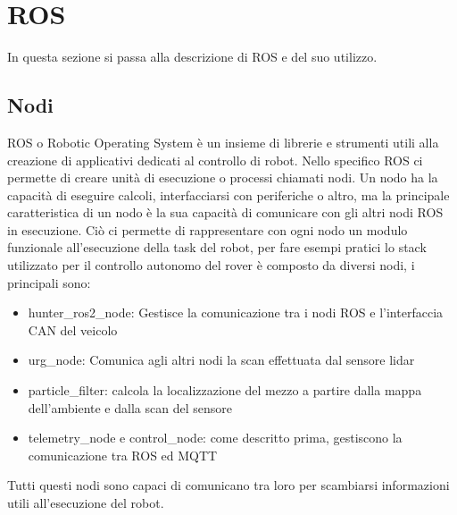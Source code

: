 \section{ROS}
In questa sezione si passa alla descrizione di ROS e del suo utilizzo.
\subsection{Nodi}
ROS o Robotic Operating System è un insieme di librerie e strumenti utili alla creazione di applicativi dedicati al controllo di robot.
Nello specifico ROS ci permette di creare unità di esecuzione o processi chiamati nodi. Un nodo ha la capacità di eseguire calcoli, interfacciarsi con periferiche o altro, ma la principale caratteristica di un nodo è la sua capacità di comunicare con gli altri nodi ROS in esecuzione.
\noindent Ciò ci permette di rappresentare con ogni nodo un modulo funzionale all'esecuzione della task del robot, per fare esempi pratici lo stack utilizzato per il controllo autonomo del rover è composto da diversi nodi, i principali sono: 
\noindent \begin{itemize}
  \item hunter\_ros2\_node: Gestisce la comunicazione tra i nodi ROS e l'interfaccia CAN del veicolo
  \item urg\_node: Comunica agli altri nodi la scan effettuata dal sensore lidar
  \item particle\_filter: calcola la localizzazione del mezzo a partire dalla mappa dell'ambiente e dalla scan del sensore
  \item telemetry\_node e control\_node: come descritto prima, gestiscono la comunicazione tra ROS ed MQTT 
\end{itemize}
Tutti questi nodi sono capaci di comunicano tra loro per scambiarsi informazioni utili all'esecuzione del robot.
